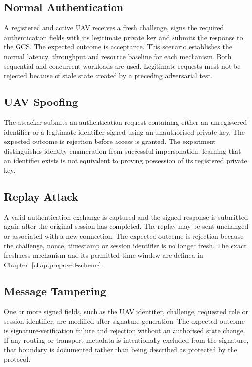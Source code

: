 \subsection{Normal Authentication}
\label{subsec:normal-authentication}

A registered and active UAV receives a fresh challenge, signs the required authentication fields with its legitimate private key and submits the response to the GCS. The expected outcome is acceptance. This scenario establishes the normal latency, throughput and resource baseline for each mechanism. Both sequential and concurrent workloads are used. Legitimate requests must not be rejected because of stale state created by a preceding adversarial test.

\subsection{UAV Spoofing}
\label{subsec:spoofing-scenario}

The attacker submits an authentication request containing either an unregistered identifier or a legitimate identifier signed using an unauthorised private key. The expected outcome is rejection before access is granted. The experiment distinguishes identity enumeration from successful impersonation: learning that an identifier exists is not equivalent to proving possession of its registered private key.

\subsection{Replay Attack}
\label{subsec:replay-scenario}

A valid authentication exchange is captured and the signed response is submitted again after the original session has completed. The replay may be sent unchanged or associated with a new connection. The expected outcome is rejection because the challenge, nonce, timestamp or session identifier is no longer fresh. The exact freshness mechanism and its permitted time window are defined in Chapter~\ref{chap:proposed-scheme}.

\subsection{Message Tampering}
\label{subsec:tampering-scenario}

One or more signed fields, such as the UAV identifier, challenge, requested role or session identifier, are modified after signature generation. The expected outcome is signature-verification failure and rejection without an authorised state change. If any routing or transport metadata is intentionally excluded from the signature, that boundary is documented rather than being described as protected by the protocol.

